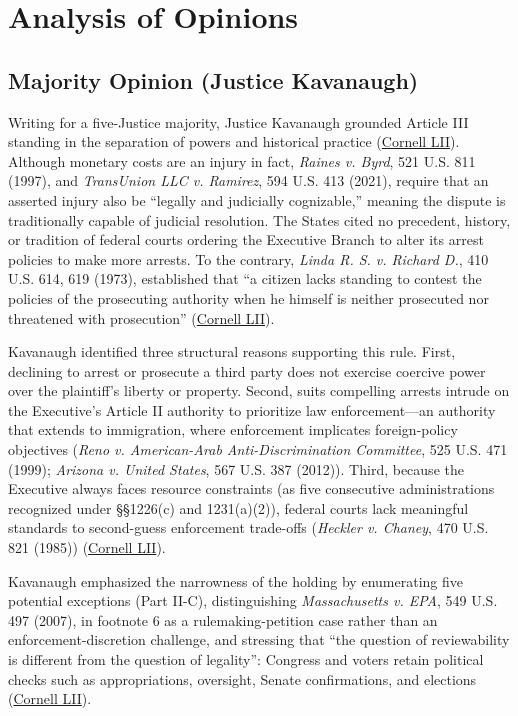 \documentclass[12pt]{article}
\begin{document}
\section{Analysis of Opinions}

\subsection{Majority Opinion (Justice Kavanaugh)}

Writing for a five-Justice majority, Justice Kavanaugh grounded Article III standing in the separation of powers and historical practice (\href{https://www.law.cornell.edu/supremecourt/text/22-58}{Cornell LII}). Although monetary costs are an injury in fact, \textit{Raines v. Byrd}, 521 U.S. 811 (1997), and \textit{TransUnion LLC v. Ramirez}, 594 U.S. 413 (2021), require that an asserted injury also be ``legally and judicially cognizable,'' meaning the dispute is traditionally capable of judicial resolution. The States cited no precedent, history, or tradition of federal courts ordering the Executive Branch to alter its arrest policies to make more arrests. To the contrary, \textit{Linda R. S. v. Richard D.}, 410 U.S. 614, 619 (1973), established that ``a citizen lacks standing to contest the policies of the prosecuting authority when he himself is neither prosecuted nor threatened with prosecution'' (\href{https://www.law.cornell.edu/supremecourt/text/22-58}{Cornell LII}).

Kavanaugh identified three structural reasons supporting this rule. First, declining to arrest or prosecute a third party does not exercise coercive power over the plaintiff's liberty or property. Second, suits compelling arrests intrude on the Executive's Article II authority to prioritize law enforcement---an authority that extends to immigration, where enforcement implicates foreign-policy objectives (\textit{Reno v. American-Arab Anti-Discrimination Committee}, 525 U.S. 471 (1999); \textit{Arizona v. United States}, 567 U.S. 387 (2012)). Third, because the Executive always faces resource constraints (as five consecutive administrations recognized under \S\S 1226(c) and 1231(a)(2)), federal courts lack meaningful standards to second-guess enforcement trade-offs (\textit{Heckler v. Chaney}, 470 U.S. 821 (1985)) (\href{https://www.law.cornell.edu/supremecourt/text/22-58}{Cornell LII}).

Kavanaugh emphasized the narrowness of the holding by enumerating five potential exceptions (Part II-C), distinguishing \textit{Massachusetts v. EPA}, 549 U.S. 497 (2007), in footnote 6 as a rulemaking-petition case rather than an enforcement-discretion challenge, and stressing that ``the question of reviewability is different from the question of legality'': Congress and voters retain political checks such as appropriations, oversight, Senate confirmations, and elections (\href{https://www.law.cornell.edu/supremecourt/text/22-58}{Cornell LII}).
\end{document}
